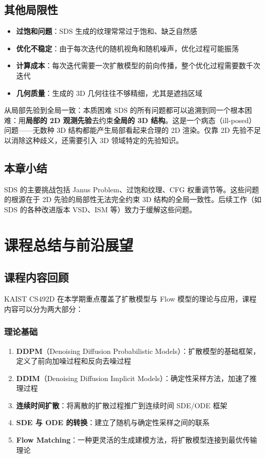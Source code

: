 \documentclass[a4paper]{article}
\begin{document}
\subsection{其他局限性}

\begin{itemize}
    \item \textbf{过饱和问题}：SDS 生成的纹理常常过于饱和、缺乏自然感
    \item \textbf{优化不稳定}：由于每次迭代的随机视角和随机噪声，优化过程可能振荡
    \item \textbf{计算成本}：每次迭代需要一次扩散模型的前向传播，整个优化过程需要数千次迭代
    \item \textbf{几何质量}：生成的 3D 几何往往不够精细，尤其是遮挡区域
\end{itemize}

\begin{warningbox}{从局部先验到全局一致：本质困难}
SDS 的所有问题都可以追溯到同一个根本困难：用\textbf{局部的 2D 观测先验}去约束\textbf{全局的 3D 结构}。这是一个病态（ill-posed）问题——无数种 3D 结构都能产生局部看起来合理的 2D 渲染。仅靠 2D 先验不足以消除这种歧义，还需要引入 3D 领域特定的先验知识。
\end{warningbox}

\subsection{本章小结}

SDS 的主要挑战包括 Janus Problem、过饱和纹理、CFG 权重调节等。这些问题的根源在于 2D 先验的局部性无法完全约束 3D 结构的全局一致性。后续工作（如 SDS 的各种改进版本 VSD、ISM 等）致力于缓解这些问题。

\newpage
\section{课程总结与前沿展望}

\subsection{课程内容回顾}

KAIST CS492D 在本学期重点覆盖了扩散模型与 Flow 模型的理论与应用，课程内容可以分为两大部分：

\subsubsection{理论基础}

\begin{enumerate}
    \item \textbf{DDPM}（Denoising Diffusion Probabilistic Models）：扩散模型的基础框架，定义了前向加噪过程和反向去噪过程
    \item \textbf{DDIM}（Denoising Diffusion Implicit Models）：确定性采样方法，加速了推理过程
    \item \textbf{连续时间扩散}：将离散的扩散过程推广到连续时间 SDE/ODE 框架
    \item \textbf{SDE 与 ODE 的转换}：建立了随机与确定性采样之间的联系
    \item \textbf{Flow Matching}：一种更灵活的生成建模方法，将扩散模型连接到最优传输理论
\end{enumerate}
\end{document}
